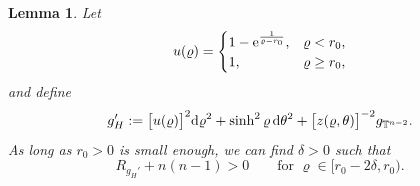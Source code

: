 \documentclass[10pt,a4paper]{amsart}
\numberwithin{equation}{section}
\newtheorem{Lemma}[Theorem]{Lemma}
\def\T{\mathbb{T}}
\def\ed{{\rm d}}
\begin{document}
\begin{Lemma}\label{tradeoffLemma}
Let
\begin{equation}
u(\varrho)=
		\begin{cases}
			1-{\rm e}^{\frac{1}{\varrho-r_0}},& \varrho< r_0, \\
		    1, & \varrho\geq r_0,
		\end{cases}
\end{equation}
and define
\begin{equation*}%
g_{H}':=\bigl[u(\varrho)\bigr]^2\ed\varrho^2 +\sinh^2 \varrho\, \ed\theta^2 +\bigl[z(\varrho,\theta)\bigr]^{-2} g_{\T^{n-2}}.
\end{equation*}
As long as $r_0>0$ is small enough, we can find $\delta>0$ such that
\[
	R_{g_{H}'} + n(n-1)  >0\qquad \mbox{for }
 \varrho \in [r_0-2\delta, r_0).
\]
\end{Lemma}
\end{document}

